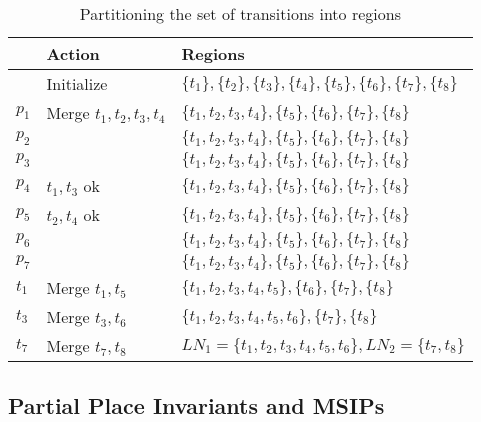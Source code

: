 \documentclass[a4paper,11pt,twoside,openright]{memoir}
\newcommand*{\LN}{\textit{LN}}
\theoremstyle{my}
\begin{document}
\begin{table}
  {\centering
    \begin{tabular}{@{}lll@{}}
      \toprule
      & Action & Regions \\
      \midrule
      & Initialize & $\{t_1\}, \{t_2\}, \{t_3\}, \{t_4\}, \{t_5\},
                     \{t_6\}, \{t_7\}, \{t_8\}$ \\[0.5em]
      $p_1$ & Merge $t_1, t_2, t_3, t_4$ & $\{t_1, t_2, t_3, t_4\}, \{t_5\},
                     \{t_6\}, \{t_7\}, \{t_8\}$ \\
      $p_2$ & & $\{t_1, t_2, t_3, t_4\}, \{t_5\},
                     \{t_6\}, \{t_7\}, \{t_8\}$ \\
      $p_3$ & & $\{t_1, t_2, t_3, t_4\}, \{t_5\},
                     \{t_6\}, \{t_7\}, \{t_8\}$ \\
      $p_4$ & $t_1, t_3$ ok & $\{t_1, t_2, t_3, t_4\}, \{t_5\},
                     \{t_6\}, \{t_7\}, \{t_8\}$ \\
      $p_5$ & $t_2, t_4$ ok & $\{t_1, t_2, t_3, t_4\}, \{t_5\},
                     \{t_6\}, \{t_7\}, \{t_8\}$ \\
      $p_6$ & & $\{t_1, t_2, t_3, t_4\}, \{t_5\},
                     \{t_6\}, \{t_7\}, \{t_8\}$ \\
      $p_7$ & & $\{t_1, t_2, t_3, t_4\}, \{t_5\},
                     \{t_6\}, \{t_7\}, \{t_8\}$ \\[0.5em]
      $t_1$ & Merge $t_1, t_5$ & $\{t_1, t_2, t_3, t_4, t_5\},
                     \{t_6\}, \{t_7\}, \{t_8\}$ \\
      $t_3$ & Merge $t_3, t_6$ & $\{t_1, t_2, t_3, t_4, t_5, t_6\},
                     \{t_7\}, \{t_8\}$ \\[0.5em]
      $t_7$ & Merge $t_7, t_8$ & $\LN_1 = \{t_1, t_2, t_3, t_4, t_5, t_6\},
                     \LN_2 = \{t_7, t_8\}$ \\
      \bottomrule
    \end{tabular}
    \par}
  \caption{Partitioning the set of transitions into regions}
  \label{tbl:example:partition}
\end{table}

\subsection{Partial Place Invariants and MSIPs}
\end{document}
